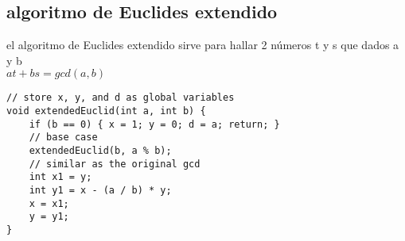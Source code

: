 \subsection{algoritmo de Euclides extendido}
el algoritmo de Euclides extendido sirve para hallar 2 números t y s que dados a y b\\
$at+bs=gcd(a,b)$
\begin{lstlisting}[style=C]
// store x, y, and d as global variables
void extendedEuclid(int a, int b) {
	if (b == 0) { x = 1; y = 0; d = a; return; }
	// base case
	extendedEuclid(b, a % b);
	// similar as the original gcd
	int x1 = y;
	int y1 = x - (a / b) * y;
	x = x1;
	y = y1;
}
\end{lstlisting}
